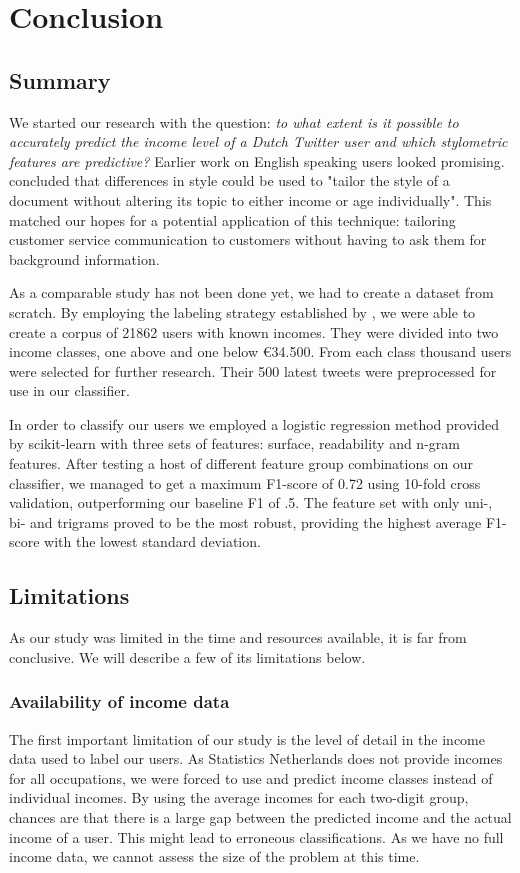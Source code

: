 \documentclass[
10pt, %
a4paper, %
oneside, %
headinclude,footinclude, %
] {book}%
\begin{document}
\chapter{Conclusion}
\label{conclusion}
\section{Summary}
We started our research with the question: \textit{to what extent is it possible to accurately predict the income level of a Dutch Twitter user and which stylometric features are predictive?} Earlier work on English speaking users looked promising. \citet{flekova} concluded that differences in style could be used to "tailor the style of a document without altering its topic to either income or age individually". This matched our hopes for a potential application of this technique: tailoring customer service communication to customers without having to ask them for background information.

As a comparable study has not been done yet, we had to create a dataset from scratch. By employing the labeling strategy established by \citet{sloan}, we were able to create a corpus of 21862 users with known incomes. They were divided into two income classes, one above and one below \euro 34.500. From each class thousand users were selected for further research. Their 500 latest tweets were preprocessed for use in our classifier.

In order to classify our users we employed a logistic regression method provided by scikit-learn \citep{sklearn} with three sets of features: surface, readability and n-gram features. After testing a host of different feature group combinations on our classifier, we managed to get a maximum F1-score of 0.72 using 10-fold cross validation, outperforming our baseline F1 of .5. The feature set with only uni-, bi- and trigrams proved to be the most robust, providing the highest average F1-score with the lowest standard deviation.

\section{Limitations}
As our study was limited in the time and resources available, it is far from conclusive. We will describe a few of its limitations below.

\subsection{Availability of income data}
The first important limitation of our study is the level of detail in the income data used to label our users. As Statistics Netherlands does not provide incomes for all occupations, we were forced to use and predict income classes instead of individual incomes. By using the average incomes for each two-digit group, chances are that there is a large gap between the predicted income and the actual income of a user. This might lead to erroneous classifications. As we have no full income data, we cannot assess the size of the problem at this time.
\end{document}
